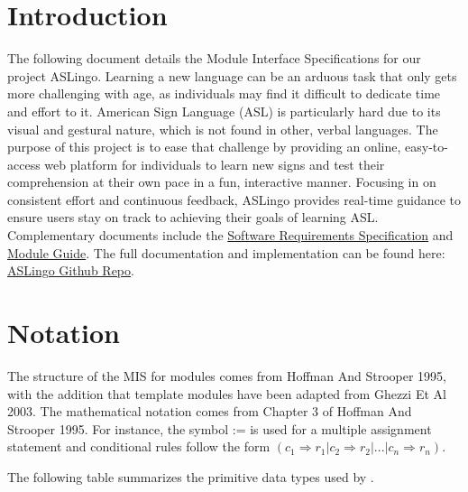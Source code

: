 \documentclass[12pt, titlepage]{article}
\begin{document}
\tableofcontents

\newpage


\section{Introduction}

The following document details the Module Interface Specifications for our project ASLingo. 
Learning a new language can be an arduous task that only gets more challenging
with age, as individuals may find it difficult to dedicate time and effort to
it. American Sign Language (ASL) is particularly hard due to its visual and
gestural nature, which is not found in other, verbal languages. The purpose of this project is
to ease that challenge by providing an online, easy-to-access web platform for
individuals to learn new signs and test their comprehension at their own pace
in a fun, interactive manner. Focusing in on consistent effort and continuous
feedback, ASLingo provides real-time guidance to ensure users stay on track to
achieving their goals of learning ASL. \\

Complementary documents include the  \href{https://github.com/stanreee/sign-language-learning/blob/main/docs/SRS/SRS.pdf}{Software Requirements Specification} and \href{https://github.com/stanreee/sign-language-learning/blob/DesignDocRev0/docs/Design/SoftArchitecture/MG.pdf}{Module Guide}.  
The full documentation and implementation can be
found here: \href{https://github.com/stanreee/sign-language-learning/tree/main}{ASLingo Github Repo}.

\section{Notation}

The structure of the MIS for modules comes from Hoffman And Strooper 1995,
with the addition that template modules have been adapted from
Ghezzi Et Al 2003.  The mathematical notation comes from Chapter 3 of
Hoffman And Strooper 1995.  For instance, the symbol := is used for a
multiple assignment statement and conditional rules follow the form $(c_1
\Rightarrow r_1 | c_2 \Rightarrow r_2 | ... | c_n \Rightarrow r_n )$.

The following table summarizes the primitive data types used by \progname. 
\end{document}
